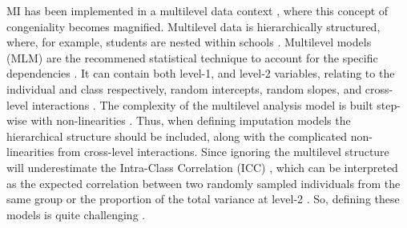 \documentclass[10pt, a4paper, titlepage]{article}
\begin{document}
MI has been implemented in a multilevel data context \citep{mistlerComparisonJointModel2017, enders2018, enders2018a, enders2020, buurenFlexibleImputationMissing2018, taljaard2008, enders2016, resche-rigon2018, audigier2018, dong2023, grund2016, grund2018a, grund2018, ludtke2017, grund2021, quartagno2022}, where this concept of congeniality becomes magnified. Multilevel data is hierarchically structured, where, for example, students are nested within schools \citep{hox2017, hox2011}. Multilevel models (MLM) are the recommened statistical technique to account for the specific dependencies \citep{hox2017, hox2011, ludtke2017}. It can contain both level-1, and level-2 variables, relating to the individual and class respectively, random intercepts, random slopes, and cross-level interactions \citep{hox2017, hox2011}. The complexity of the multilevel analysis model is built step-wise with non-linearities \citep{hox2017, hox2011}. Thus, when defining imputation models the hierarchical structure should be included, along with the complicated non-linearities from cross-level interactions. Since ignoring the multilevel structure will underestimate the Intra-Class Correlation (ICC) \citep{buurenFlexibleImputationMissing2018, ludtke2017, taljaard2008, hox2011}, which can be interpreted as the expected correlation between two randomly sampled individuals from the same group or the proportion of the total variance at level-2 \citep{gulliford2005, shieh2012, hox2011}. So, defining these models is quite challenging \citep{buurenFlexibleImputationMissing2018, burgette2010, hox2011}.
\end{document}

